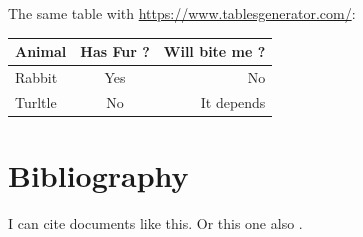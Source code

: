 \documentclass[10pt,a4paper,twoside]{article}
\begin{document}
The same table with \url{https://www.tablesgenerator.com/}: %

\begin{center}
  \begin{tabular}{@{}lcr@{}}
    \toprule
    \textbf{Animal} & \textbf{Has Fur ?} & \textbf{Will bite me ?} \\ \midrule
    Rabbit          & Yes                & No                      \\
    Turltle         & No                 & It depends              \\ \bottomrule
  \end{tabular}
\end{center}


\section{Bibliography}

I can cite \cite{hawking1974black} documents like this.
Or this one also \cite{belczynski2012missing}.



\end{document}
